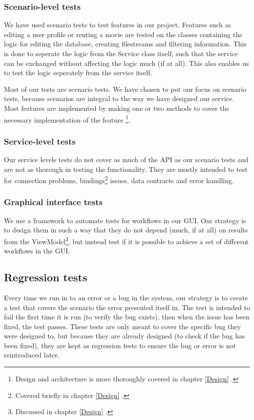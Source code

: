 \subsubsection{Scenario-level tests}
\label{testing_strategy_types_scenario}
We have used scenario tests to test features in our project. Features such as editing a user profile or renting a movie are tested on the classes containing the logic for editing the database, creating filestreams and filtering information. This is done to seperate the logic from the Service class itself, such that the service can be exchanged without affecting the logic much (if at all). This also enables us to test the logic seperately from the service itself.

Most of our tests are scenario tests. We have chosen to put our focus on scenario tests, because scenarios are integral to the way we have designed our service. Most features are implemented by making one or two methods to cover the necessary implementation of the feature \footnote{Design and architecture is more thoroughly covered in chapter \ref{Design} .}.

\subsubsection{Service-level tests}
\label{testing_strategy_types_service}
Our service levels tests do not cover as much of the API as our scenario tests and are not as thorough in testing the functionality. They are mostly intended to test for connection problems, bindings\footnote{Covered briefly in chapter \ref{Design} .} issues, data contracts and error handling. 

\subsubsection{Graphical interface tests}
\label{testing_strategy_types_enduser}
We use a framework to automate tests for workflows in our GUI. Our strategy is to design them in such a way that they do not depend (much, if at all) on results from the ViewModel\footnote{Discussed in chapter \ref{Design} .}, but instead test if it is possible to achieve a set of different workflows in the GUI.

\subsection{Regression tests}
\label{testing_strategy_regression}
Every time we run in to an error or a bug in the system, our strategy is to create a test that covers the scenario the error presented itself in. The test is intended to fail the first time it is run (to verify the bug exists), then when the issue has been fixed, the test passes. These tests are only meant to cover the specific bug they were designed to, but because they are already designed (to check if the bug has been fixed), they are kept as regression tests to ensure the bug or error is not reintroduced later.

